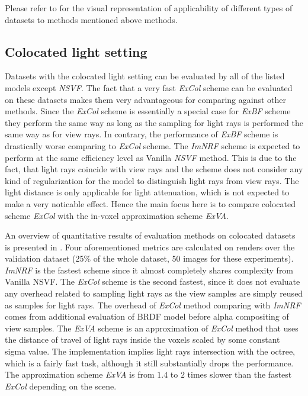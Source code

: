 Please refer to  for the visual representation of applicability of different types of datasets to methods mentioned above methods.






\subsection{Colocated light setting}
\label{subsec:experiments_coloc}

Datasets with the colocated light setting can be evaluated by all of the listed models except \textit{NSVF}.
The fact that a very fast \textit{ExCol} scheme can be evaluated on these datasets
makes them very advantageous for comparing against other methods.
Since the \textit{ExCol} scheme is essentially a special case for \textit{ExBF} scheme
they perform the same way as long as the sampling for light rays is performed the same way as for view rays.
In contrary, the performance of \textit{ExBF} scheme is drastically worse comparing to \textit{ExCol} scheme.
The \textit{ImNRF} scheme is expected to perform at the same efficiency level as Vanilla \textit{NSVF} method.
This is due to the fact, that light rays coincide with view rays 
and the scheme does not consider any kind of regularization for the model
to distinguish light rays from view rays.
The light distance is only applicable for light attenuation, 
which is not expected to make a very noticable effect.
Hence the main focus here is to compare colocated scheme \textit{ExCol} with the in-voxel approximation scheme \textit{ExVA}.





An overview of quantitative results of evaluation methods on colocated datasets is presented in .
Four aforementioned metrics are calculated on renders over the validation dataset (25\% of the whole dataset, 50 images for these experiments).
\textit{ImNRF} is the fastest scheme since it almost completely shares complexity from Vanilla NSVF.
The \textit{ExCol} scheme is the second fastest,
since it does not evaluate any overhead related to sampling light rays
as the view samples are simply reused as samples for light rays.
The overhead of \textit{ExCol} method comparing with \textit{ImNRF} comes from additional evaluation of BRDF model before alpha compositing of view samples.
The \textit{ExVA} scheme is an approximation of \textit{ExCol} method
that uses the distance of travel of light rays inside the voxels scaled by some constant sigma value.
The implementation implies light rays intersection with the octree,
which is a fairly fast task, although it still substantially drops the performance.
The approximation scheme \textit{ExVA} is from $1.4$ to $2$ times slower
than the fastest \textit{ExCol} depending on the scene.



